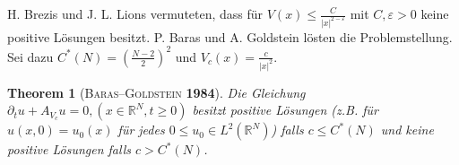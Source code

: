 \documentclass{beamer}
\newtheorem{thm}{Theorem}
\theoremstyle{break}
\begin{document}
\begin{frame}
H. Brezis und J. L. Lions vermuteten, dass f\"ur $V(x) \le \frac{C}{|x|^{2-\varepsilon}}$ mit $C, \varepsilon>0$ keine positive L\"osungen besitzt. P. Baras und A. Goldstein l\"osten die Problemstellung.  Sei dazu $C^*(N)=( \tfrac{N-2}{2} )^2$ und $V_c(x) = \frac{c}{|x|^2}$. \vspace{.25cm}

\begin{thm}[\textsc{Baras--Goldstein} \textbf{1984}]\label{main}
Die Gleichung  $\partial_t u + A_{V_c} u =0, (x\in \mathbb R^N, t\ge0)$ besitzt positive L\"osungen (z.B. f\"ur $u(x,0)=u_0(x)$ f\"ur jedes $0\le u_0\in L^2(\mathbb R^N)$) falls $c\le C^*(N)$ und keine positive L\"osungen falls $c>C^*(N)$.
\end{thm}
\end{frame}
\end{document}
